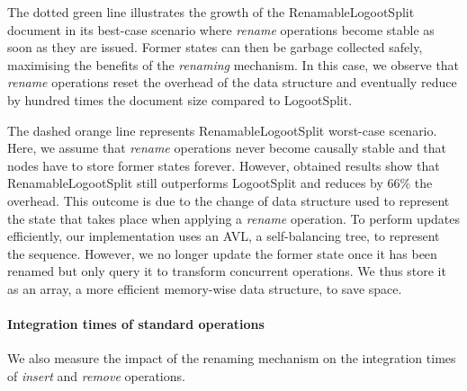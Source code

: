 \documentclass[sigplan,10pt]{acmart}
\begin{document}
\begin{sloppypar}
The dotted green line illustrates the growth of the RenamableLogootSplit document in its best-case scenario where \emph{rename} operations become stable as soon as they are issued.
Former states can then be garbage collected safely, maximising the benefits of the \emph{renaming} mechanism.
In this case, we observe that \emph{rename} operations reset the overhead of the data structure and eventually reduce by hundred times the document size compared to LogootSplit.
\end{sloppypar}

The dashed orange line represents RenamableLogootSplit worst-case scenario.
Here, we assume that \emph{rename} operations never become causally stable and that nodes have to store former states forever.
However, obtained results show that RenamableLogootSplit still outperforms LogootSplit and reduces by 66\% the overhead.
This outcome is due to the change of data structure used to represent the state that takes place when applying a \emph{rename} operation.
To perform updates efficiently, our implementation uses an AVL, a self-balancing tree, to represent the sequence.
However, we no longer update the former state once it has been renamed but only query it to transform concurrent operations.
We thus store it as an array, a more efficient memory-wise data structure, to save space.

\paragraph{Integration times of standard operations}

We also measure the impact of the renaming mechanism on the integration times of \emph{insert} and \emph{remove} operations.
\end{document}
